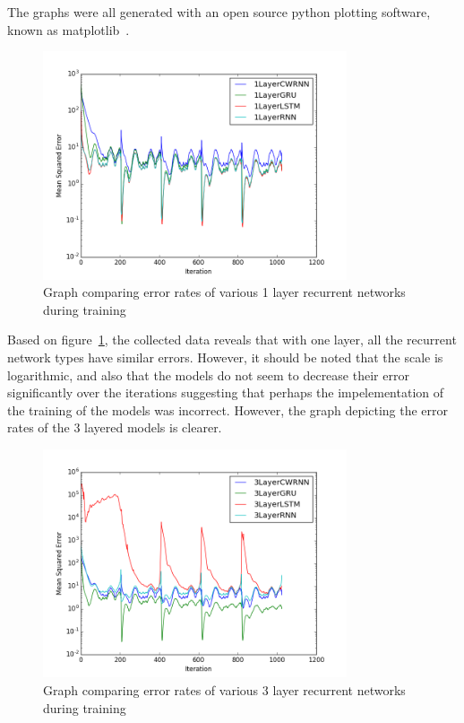 \documentclass[12pt, titlepage]{article}
\begin{document}
The graphs were all generated with an open source python plotting software,
known as matplotlib~\cite{matplotlib}.
\begin{figure}[H]
	\includegraphics[width=0.8\textwidth]{1LayerComparison.png}
	\caption{Graph comparing error rates of various 1 layer recurrent networks
	during training}
	\label{fig:1layer}
\end{figure}

Based on figure~\ref{fig:1layer}, the collected data reveals that with one
layer, all the recurrent network types have similar errors. However, it should
be noted that the scale is logarithmic, and also that the models do not seem to
decrease their error significantly over the iterations suggesting that perhaps
the impelementation of the training of the models was incorrect. However, the
graph depicting the error rates of the 3 layered models is clearer.

\begin{figure}[H]
	\includegraphics[width=0.8\textwidth]{3LayerComparison.png}
	\caption{Graph comparing error rates of various 3 layer recurrent networks
	during training}
	\label{fig:3layer}
\end{figure}
\end{document}
